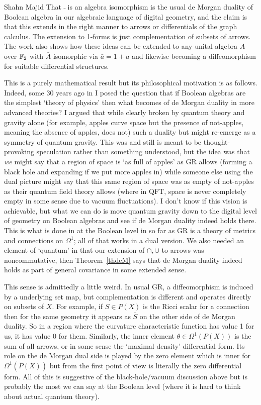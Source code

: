\begin{artengenv}{Shahn Majid}
That $\bar{\ }$ is an algebra isomorphism is the usual de Morgan duality of Boolean algebra in our algebraic language of digital geometry, and the claim is that this extends in the right manner to arrows or differentials of the graph calculus. The extension to 1-forms is just complementation of subsets of arrows. The work \parencite{Ma:boo} also shows how these ideas can be extended to any unital algebra $A$ over ${\mathbb{F}}_2$ with $\bar A$ isomorphic via $\bar a=1+a$ and likewise becoming a diffeomorphism for suitable differential structures. 

This is a purely mathematical result but its philosophical motivation is as follows. Indeed, some 30 years ago in \parencite{Ma:pri} I posed the question that if Boolean algebras are the simplest `theory of physics' then what becomes of de Morgan duality in more advanced theories? I argued that while clearly broken by quantum theory and gravity alone (for example, apples curve space but the presence of not-apples, meaning the absence of apples, does not) such a duality but might re-emerge as a symmetry of quantum gravity. This was and still is meant to be thought-provoking speculation rather than something understood, but the idea was that {\em we} might say that a region of space is `as full of apples' as GR allows (forming a black hole and expanding if we put more apples in) while someone else using the dual picture might say that this same region of space was as empty of not-apples as their quantum field theory allows (where in QFT, space is never completely empty in some sense due to vacuum fluctuations). I don't know if this vision is achievable, but what we can do is move quantum gravity down to the digital level of geometry on Boolean algebras and see if de Morgan duality indeed holds there. This is what is done in \parencite{Ma:boo} at the Boolean level in so far as GR is a theory of metrics and connections on $\Omega^1$; all of that works in a dual version. We also needed an element of `quantum' in that our extension of $\cap,\cup$ to arrows was noncommutative, then Theorem~\ref{thdeM} says 
that de Morgan duality indeed holds as part of general covariance in some extended sense. 

This sense is admittedly a little weird. In usual GR, a diffeomorphism is induced by a underlying set map, but complementation is different and operates directly on subsets of $X$. For example, if $S\in P(X)$ is the Ricci scalar for a connection then for the same geometry it appears as $\bar S$ on the other side of de Morgan duality. So in a region where the curvature characteristic function has value 1 for us, it has value 0 for them. Similarly, the inner element $\theta\in \Omega^1(P(X))$ is the sum of all arrows, or in some sense the `maximal density' differential form. Its role on the de Morgan dual side is played by the zero element which is inner for $\Omega^1(\bar P(X))$ but from the first point of view is literally the zero differential form. All of this is suggestive of the black-hole/vacuum discussion above but is probably the most we can say at the Boolean level (where it is hard to think about actual quantum theory). 


\end{artengenv}
